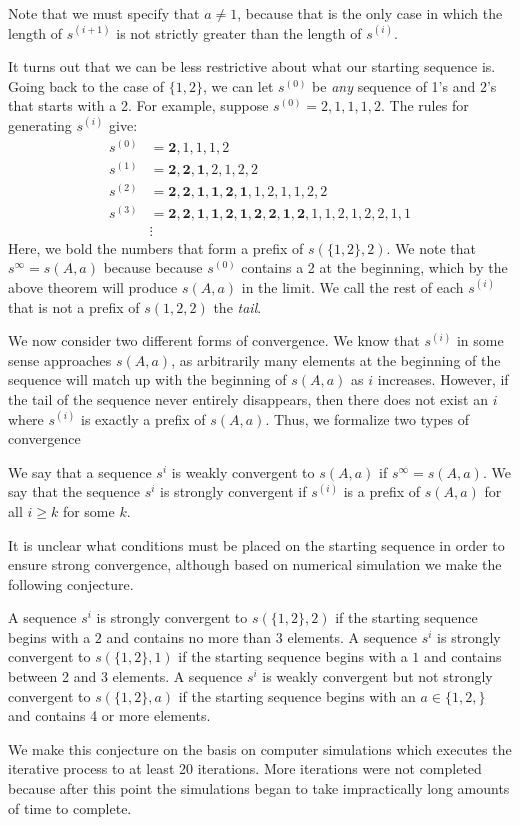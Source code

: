 \documentclass[runningheads,a4paper]{llncs}
\begin{document}
Note that we must specify that $a \neq 1$, because that is the only case in which the length of $s^{(i+1)}$ is not strictly greater than the length of $s^{(i)}$. 

It turns out that we can be less restrictive about what our starting sequence is. Going back to the case of $\{1,2\}$, we can let $s^{(0)}$ be \emph{any} sequence of 1's and 2's that starts with a 2. For example, suppose $s^{(0)} = 2,1,1,1,2$. The rules for generating $s^{(i)}$ give:
\begin{align*}
s^{(0)}&= \mathbf{2},1,1,1,2\\
s^{(1)} &= \mathbf{2,2,1},2,1,2,2\\
s^{(2)} &= \mathbf{2,2,1,1,2,1},1,2,1,1,2,2\\
s^{(3)} &= \mathbf{2,2,1,1,2,1,2,2,1,2},1,1,2,1,2,2,1,1\\
&\vdots
\end{align*}
Here, we bold the numbers that form a prefix of $s(\{1,2\},2)$. We note that $s^\infty = s(A,a)$ because because $s^{(0)}$ contains a 2 at the beginning, which by the above theorem will produce $s(A,a)$ in the limit. We call the rest of each $s^{(i)}$ that is not a prefix of $s({1,2},2)$ the \emph{tail}.

We now consider two different forms of convergence. We know that $s^{(i)}$ in some sense approaches $s(A,a)$, as arbitrarily many elements at the beginning of the sequence will match up with the beginning of $s(A,a)$ as $i$ increases. However, if the tail of the sequence never entirely disappears, then there does not exist an $i$ where $s^{(i)}$ is exactly a prefix of $s(A,a)$. Thus, we formalize two types of convergence
\begin{definition} We say that a sequence $s^{i}$ is weakly convergent to $s(A,a)$ if $s^\infty = s(A,a)$. We say that the sequence $s^{i}$ is strongly convergent if $s^{(i)}$ is a prefix of $s(A,a)$ for all $i \geq k$ for some $k$.
\end{definition}
It is unclear what conditions must be placed on the starting sequence in order to ensure strong convergence, although based on numerical simulation we make the following conjecture. 

\begin{conjecture} A sequence $s^i$ is strongly convergent to $s(\{1,2\}, 2)$ if the starting sequence begins with a $2$ and contains no more than 3 elements. A sequence $s^i$ is strongly convergent to $s(\{1,2\}, 1)$ if the starting sequence begins with a $1$ and contains between 2 and 3 elements. A sequence $s^i$ is weakly convergent but not strongly convergent to $s(\{1,2\}, a)$ if the starting sequence begins with an $a \in \{1,2,\}$ and contains 4 or more elements.
\end{conjecture}
We make this conjecture on the basis on computer simulations which executes the iterative process to at least 20 iterations. More iterations were not completed because after this point the simulations began to take impractically long amounts of time to complete. 
\end{document}
